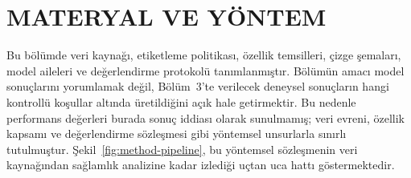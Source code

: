 \chapter{MATERYAL VE YÖNTEM}
\label{chap:materyal-yontem}

Bu bölümde veri kaynağı, etiketleme politikası, özellik temsilleri, çizge şemaları, model aileleri ve değerlendirme protokolü tanımlanmıştır. Bölümün amacı model sonuçlarını yorumlamak değil, Bölüm~3'te verilecek deneysel sonuçların hangi kontrollü koşullar altında üretildiğini açık hale getirmektir. Bu nedenle performans değerleri burada sonuç iddiası olarak sunulmamış; veri evreni, özellik kapsamı ve değerlendirme sözleşmesi gibi yöntemsel unsurlarla sınırlı tutulmuştur. Şekil~\ref{fig:method-pipeline}, bu yöntemsel sözleşmenin veri kaynağından sağlamlık analizine kadar izlediği uçtan uca hattı göstermektedir.

